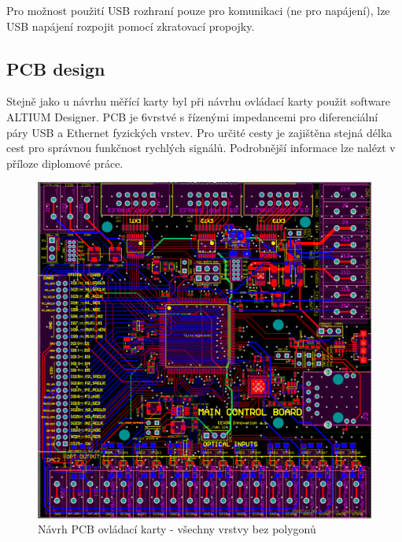     Pro možnost použití USB rozhraní pouze pro komunikaci (ne pro napájení),
    lze USB napájení rozpojit pomocí zkratovací propojky.\par
\clearpage

\subsection{PCB design}
   Stejně jako u návrhu měřící karty byl při návrhu ovládací karty použit software ALTIUM Designer.
   PCB je 6vrstvé s řízenými impedancemi pro diferenciální páry USB a Ethernet fyzických vrstev.
   Pro určité cesty je zajištěna stejná délka cest pro správnou funkčnost rychlých signálů.
   Podrobnější informace lze nalézt v příloze diplomové práce.\par
\begin{figure}[ht!]
    \centering
    \includegraphics[width = 1\textwidth]{obrazky/all_layers_no_poly_control.png}
    \caption{Návrh PCB ovládací karty - všechny vrstvy bez polygonů}
    \label{fig:Všechny vrstvy bez polygonů control}
\end{figure}